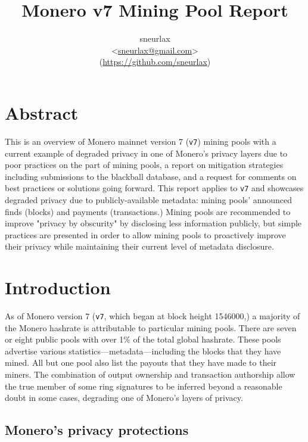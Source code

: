 \documentclass[notitlepage]{report}
\title{Monero v7 Mining Pool Report}
\author{sneurlax \\
\textless\url{sneurlax@gmail.com}\textgreater \\
(\url{https://github.com/sneurlax})}
\begin{document}
\maketitle
\thispagestyle{empty}

\section*{Abstract}

This is an overview of Monero mainnet version 7 (\verb/v7/) mining pools with a current example of degraded privacy in one of Monero's privacy layers due to poor practices on the part of mining pools, a report on mitigation strategies including submissions to the blackball database, and a request for comments on best practices or solutions going forward.  This report applies to \verb/v7/ and showcases degraded privacy due to publicly-available metadata: mining pools' announced finds (blocks) and payments (transactions.)  Mining pools are recommended to improve "privacy by obscurity" by disclosing less information publicly, but simple practices are presented in order to allow mining pools to proactively improve their privacy while maintaining their current level of metadata disclosure.

\clearpage

\tableofcontents

\section{Introduction}
\setcounter{chapter}{1}

\setcounter{page}{1} %

As of Monero version 7 (\verb/v7/, which began at block height 1546000,) a majority of the Monero hashrate is attributable to particular mining pools.  There are seven or eight public pools with over 1\% of the total global hashrate.  These pools advertise various statistics---metadata---including the blocks that they have mined.  All but one pool also list the payouts that they have made to their miners.  The combination of output ownership and transaction authorship allow the true member of some ring signatures to be inferred beyond a reasonable doubt in some cases, degrading one of Monero's layers of privacy.

\subsection{Monero's privacy protections}
\end{document}
